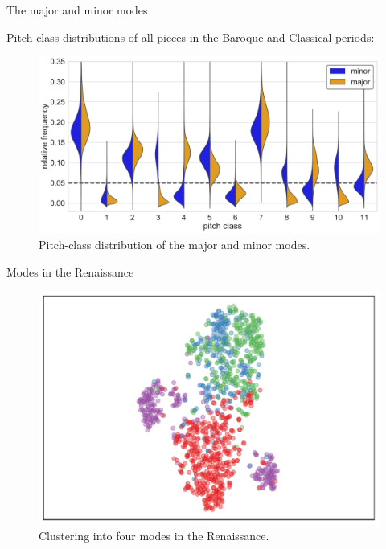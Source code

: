 \begin{frame}{The major and minor modes}

    Pitch-class distributions of all pieces in the Baroque and Classical periods:

    \begin{figure}
        \includegraphics[width=\linewidth,height=.7\textheight,keepaspectratio]{img/Figure8.pdf}
        \caption{Pitch-class distribution of the major and minor modes.}
    \end{figure}
\end{frame}

\begin{frame}{Modes in the Renaissance}
    \begin{figure}
        \includegraphics[width=\linewidth,height=.7\textheight,keepaspectratio]{img/Figure6.pdf}
        \caption{Clustering into four modes in the Renaissance.}
    \end{figure}
\end{frame}

